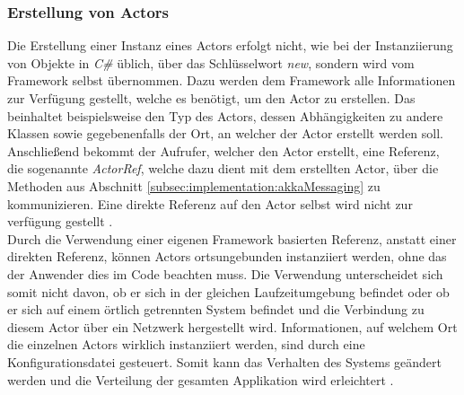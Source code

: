 \subsubsection{Erstellung von Actors}
\label{subsec:implementation:actorCreation}
Die Erstellung einer Instanz eines Actors erfolgt nicht, wie bei der Instanziierung von Objekte in \textit{C\#} üblich, über das Schlüsselwort \textit{new}, sondern wird vom Framework selbst übernommen. Dazu werden dem Framework alle Informationen zur Verfügung gestellt, welche es benötigt, um den Actor zu erstellen. Das beinhaltet beispielsweise den Typ des Actors, dessen Abhängigkeiten zu andere Klassen sowie gegebenenfalls der Ort, an welcher der Actor erstellt werden soll. Anschließend bekommt der Aufrufer, welcher den Actor erstellt, eine Referenz, die sogenannte \textit{ActorRef}, welche dazu dient mit dem erstellten Actor, über die Methoden aus Abschnitt \ref{subsec:implementation:akkaMessaging} zu kommunizieren. Eine direkte Referenz auf den Actor selbst wird nicht zur verfügung gestellt \citep{Akka.netCommunityAkka.NETDocumentation}. \\
% 
% 
Durch die Verwendung einer eigenen Framework basierten Referenz, anstatt einer direkten Referenz, können Actors ortsungebunden instanziiert werden, ohne das der Anwender dies im Code beachten muss. Die Verwendung unterscheidet sich somit nicht davon, ob er sich in der gleichen Laufzeitumgebung befindet oder ob er sich auf einem örtlich getrennten System befindet und die Verbindung zu diesem Actor über ein Netzwerk hergestellt wird. Informationen, auf welchem Ort die einzelnen Actors wirklich instanziiert werden, sind durch eine Konfigurationsdatei gesteuert. Somit kann das Verhalten des Systems geändert werden und die Verteilung der gesamten Applikation wird  erleichtert .
% 
% 

